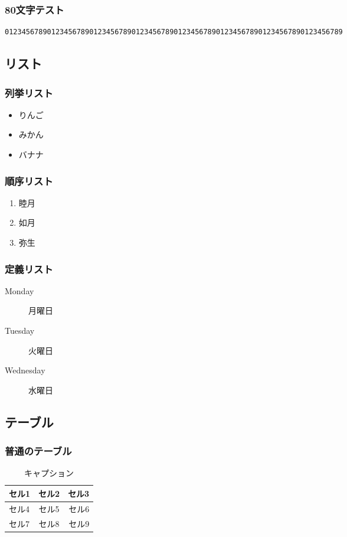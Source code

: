 \subsubsection{80文字テスト}
\begin{lstlisting}
01234567890123456789012345678901234567890123456789012345678901234567890123456789
\end{lstlisting}

\subsection{リスト}

\subsubsection{列挙リスト}
\begin{itemize}
\item りんご
\item みかん
\item バナナ
\end{itemize}

\subsubsection{順序リスト}
\begin{enumerate}
\item 睦月
\item 如月
\item 弥生
\end{enumerate}

\subsubsection{定義リスト}
\begin{description}
\item[Monday] 月曜日
\item[Tuesday] 火曜日
\item[Wednesday] 水曜日
\end{description}

\subsection{テーブル}

\subsubsection{普通のテーブル}
\begin{table}[htbp]
\begin{center}
\begin{tabular}{|l|c|r|}
\hline
セル1 & セル2 & セル3 \\ \hline
セル4 & セル5 & セル6 \\ \hline
セル7 & セル8 & セル9 \\ \hline
\end{tabular}
\caption{キャプション}
\end{center}
\end{table}

